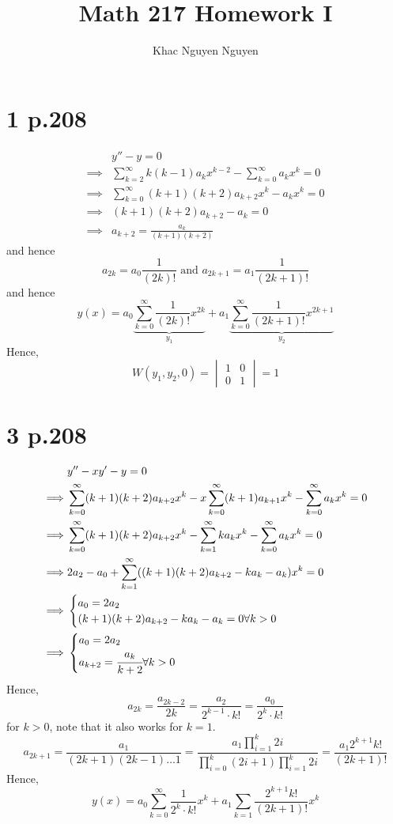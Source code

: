 \documentclass[11pt]{article}
\title{\textbf{Math 217 Homework I}}
\author{Khac Nguyen Nguyen}
\date{}
\begin{document}
\section*{1 p.208}
\begin{equation*}
    \begin{aligned}
        &y''-y=0 \\
        \implies &\sum_{k=2}^\infty k(k-1)a_kx^{k-2} - \sum_{k=0}^\infty a_kx^k = 0 \\
        \implies &\sum_{k=0}^\infty (k+1)(k+2)a_{k+2}x^k  - a_kx^k = 0 \\
        \implies &(k+1)(k+2)a_{k+2}-a_k = 0 \\
        \implies &a_{k+2} = \frac{a_k}{(k+1)(k+2)}
    \end{aligned}
\end{equation*}
and hence 
\[
    a_{2k} = a_0 \frac{1}{(2k)!} \text{ and } a_{2k+1} = a_1 \frac{1}{(2k+1)!}
\]
and hence 
\[
    y(x) = a_0 \underbrace{\sum_{k=0}^\infty \frac{1}{(2k)!}x^{2k}}_{y_1} + a_1 \underbrace{\sum_{k=0}^\infty \frac{1}{(2k+1)!}x^{2k+1}}_{y_2}
\]
Hence, 
\[
    W(y_1, y_2, 0) = 
    \begin{vmatrix}
        1 & 0 \\
        0 & 1
    \end{vmatrix} = 1
\]
\newpage
\section*{3 p.208}
\begin{equation*}
    \begin{aligned}
        & y''-xy' -y = 0 \\
        \implies & \sum_{k=0}^\infty (k+1)(k+2)a_{k+2}x^k - x \sum_{k=0}^\infty (k+1)a_{k+1}x^k - \sum_{k=0}^\infty a_k x^k = 0 \\
        \implies & \sum_{k=0}^\infty (k+1)(k+2)a_{k+2}x^k -  \sum_{k=1}^\infty ka_kx^k - \sum_{k=0}^\infty a_k x^k = 0 \\
        \implies & 2a_2 - a_0 + \sum_{k=1}^\infty ((k+1)(k+2)a_{k+2} - ka_k - a_k)x^k = 0 \\
        \implies & 
        \begin{cases}
            a_0 = 2a_2 \\
            (k+1)(k+2)a_{k+2} - ka_k - a_k = 0 \forall k > 0
        \end{cases} \\
        \implies & 
        \begin{cases}
            a_0 = 2a_2 \\
            a_{k+2} = \cfrac{a_k}{k+2} \forall k > 0
        \end{cases}
    \end{aligned}
\end{equation*}
Hence, 
\[
    a_{2k} = \frac{a_{2k-2}}{2k} = \frac{a_2}{2^{k-1} \cdot k!} = \frac{a_0}{2^k \cdot k!}
\]
for $k >0$, note that it also works for $k=1$. 
\[
    a_{2k+1} = \frac{a_1}{(2k+1)(2k-1)\hdots 1} = \frac{a_1 \prod_{i=1}^k 2i}{\prod_{i=0}^k (2i+1) \prod_{i=1}^k 2i} = \frac{a_1 2^{k+1} k!}{(2k+1)!} 
\]
Hence, 
\[
    y(x) = a_0 \sum_{k=0}^\infty \frac{1}{2^k \cdot k!} x^k + a_1 \sum_{k=1} \frac{2^{k+1}k!}{(2k+1)!}x^k     
\]
\newpage
\end{document}
